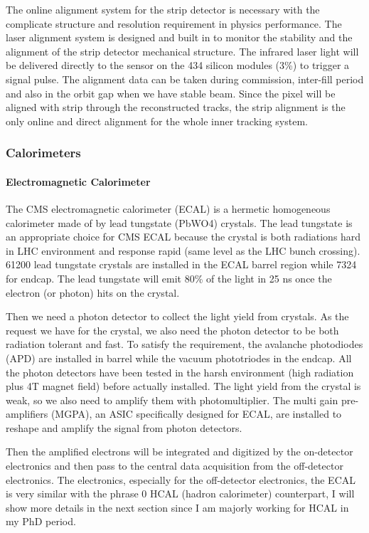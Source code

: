 The online alignment system\cite{Sirunyan:2017rbc} for the strip detector is necessary with the complicate structure and resolution requirement in physics performance. The laser alignment system is designed and built in to monitor the stability and the alignment of the strip detector mechanical structure. The infrared laser light will be delivered directly to the sensor on the 434 silicon modules (3\%) to trigger a signal pulse. The alignment data can be taken during commission, inter-fill period and also in the orbit gap when we have stable beam. Since the pixel will be aligned with strip through the reconstructed tracks, the strip alignment is the only online and direct alignment for the whole inner tracking system. 


\subsubsection{Calorimeters}
\paragraph{Electromagnetic Calorimeter}
The CMS electromagnetic calorimeter (ECAL) is a hermetic homogeneous calorimeter made of by lead tungstate (PbWO4) crystals. The lead tungstate is an appropriate choice for CMS ECAL because the crystal is both radiations hard in LHC environment and response rapid (same level as the LHC bunch crossing). 61200 lead tungstate crystals are installed in the ECAL barrel region while 7324 for endcap. The lead tungstate will emit 80\% of the light in 25 ns once the electron (or photon) hits on the crystal.

Then we need a photon detector to collect the light yield from crystals. As the request we have for the crystal, we also need the photon detector to be both radiation tolerant and fast. To satisfy the requirement, the avalanche photodiodes (APD) are installed in barrel while the vacuum phototriodes in the endcap. All the photon detectors have been tested in the harsh environment (high radiation plus 4T magnet field) before actually installed. The light yield from the crystal is weak, so we also need to amplify them with photomultiplier. The multi gain pre-amplifiers (MGPA), an ASIC specifically designed for ECAL, are installed to reshape and amplify the signal from photon detectors.

Then the amplified electrons will be integrated and digitized by the on-detector electronics and then pass to the central data acquisition from the off-detector electronics. The electronics, especially for the off-detector electronics, the ECAL is very similar with the phrase 0 HCAL (hadron calorimeter) counterpart, I will show more details in the next section since I am majorly working for HCAL in my PhD period. 

